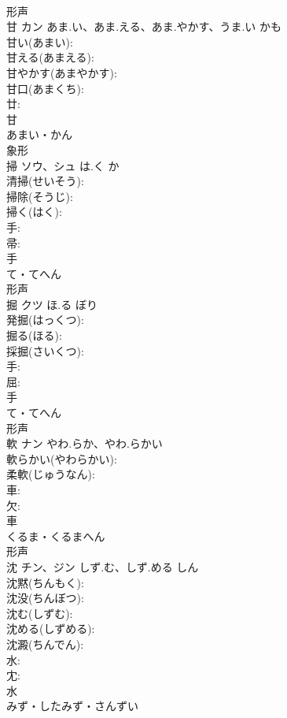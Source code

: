 \documentclass[8pt]{extreport}
\begin{document}
\begin{CJK}{UTF8}{min}
\\	形声 
\\	甘	カン	あま.い、あま.える、あま.やかす、うま.い	かも	
\\	甘い(あまい): 
\\	甘える(あまえる): 
\\	甘やかす(あまやかす): 
\\	甘口(あまくち): 
\\	廿: 
\\	甘	
\\	あまい・かん	
\\	象形 
\\	掃	ソウ、シュ	は.く	か	
\\	清掃(せいそう): 
\\	掃除(そうじ): 
\\	掃く(はく): 
\\	手: 
\\	帚: 
\\	手	
\\	て・てへん	
\\	形声 
\\	掘	クツ	ほ.る	ぼり	
\\	発掘(はっくつ): 
\\	掘る(ほる): 
\\	採掘(さいくつ): 
\\	手: 
\\	屈: 
\\	手	
\\	て・てへん	
\\	形声 
\\	軟	ナン	やわ.らか、やわ.らかい		
\\	軟らかい(やわらかい): 
\\	柔軟(じゅうなん): 
\\	車: 
\\	欠: 
\\	車	
\\	くるま・くるまへん	
\\	形声 
\\	沈	チン、ジン	しず.む、しず.める	しん	
\\	沈黙(ちんもく): 
\\	沈没(ちんぼつ): 
\\	沈む(しずむ): 
\\	沈める(しずめる): 
\\	沈澱(ちんでん): 
\\	水: 
\\	冘: 
\\	水	
\\	みず・したみず・さんずい	

\end{CJK}
\end{document}
